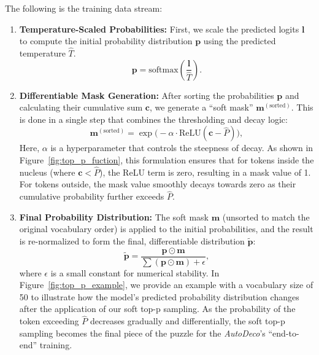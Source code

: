The following is the training data stream:
\begin{enumerate}[leftmargin=2em, ]
    \item \textbf{Temperature-Scaled Probabilities:} First, we scale the predicted logits $\mathbf{l}$ to compute the initial probability distribution $\mathbf{p}$ using the predicted temperature $\hat{T}$.
    \begin{equation}
        \mathbf{p} = \text{softmax}\left(\frac{\mathbf{l}}{\hat{T}}\right).
    \end{equation}

    \item \textbf{Differentiable Mask Generation:} After sorting the probabilities $\mathbf{p}$ and calculating their cumulative sum $\mathbf{c}$, we generate a ``soft mask'' $\mathbf{m}^{(\text{sorted})}$. This is done in a single step that combines the thresholding and decay logic:
    \begin{equation}
        \mathbf{m}^{(\text{sorted})} = \exp\big(-\alpha \cdot \text{ReLU}(\mathbf{c} - \hat{P})\big),
    \end{equation}
    Here, $\alpha$ is a hyperparameter that controls the steepness of decay. As shown in Figure~\ref{fig:top_p_fuction}, this formulation ensures that for tokens inside the nucleus (where $\mathbf{c} < \hat{P}$), the ReLU term is zero, resulting in a mask value of 1. For tokens outside, the mask value smoothly decays towards zero as their cumulative probability further exceeds $\hat{P}$.

    \item \textbf{Final Probability Distribution:} The soft mask $\mathbf{m}$ (unsorted to match the original vocabulary order) is applied to the initial probabilities, and the result is re-normalized to form the final, differentiable distribution $\tilde{\mathbf{p}}$:
    \begin{equation}
        \tilde{\mathbf{p}} = \frac{\mathbf{p} \odot \mathbf{m}}{\sum (\mathbf{p} \odot \mathbf{m}) + \epsilon},
    \end{equation}
    where $\epsilon$ is a small constant for numerical stability. In Figure~\ref{fig:top_p_example}, we provide an example with a vocabulary size of 50 to illustrate how the model's predicted probability distribution changes after the application of our soft top-p sampling. As the probability of the token exceeding $\hat{P}$ decreases gradually and differentially, the soft top-p sampling becomes the final piece of the puzzle for the \textit{AutoDeco}'s ``end-to-end'' training.

\end{enumerate}

